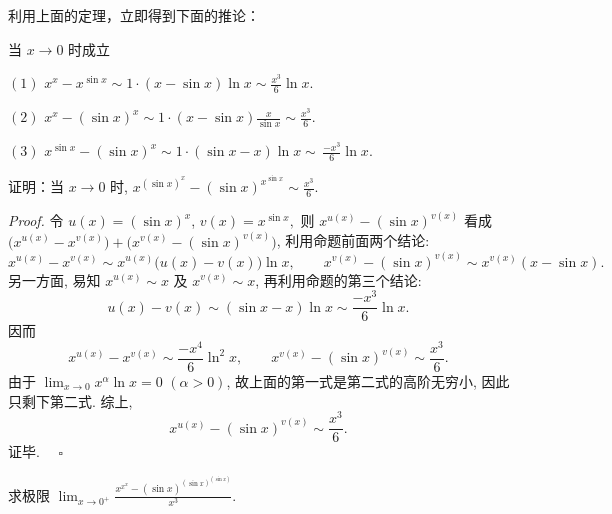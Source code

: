 利用上面的定理，立即得到下面的推论：

\begin{corollary}{}
当 $x\to0$ 时成立

$(1)$ $x^{x}-x^{\sin x}\sim1\cdot(x-\sin x)\ln x\sim\frac{x^{3}}{6}\ln x.$

$(2)$ $x^{x}-(\sin x)^{x}\sim1\cdot(x-\sin x)\frac{x}{\sin x}\sim\frac{x^{3}}{6}.$

$(3)$ $x^{\sin x}-(\sin x)^{x}\sim1\cdot(\sin x-x)\ln x\sim\,\frac{-x^{3}}{6}\ln x.$
\end{corollary}

\vs

\begin{example}{}
证明：当 $x\to0$ 时, $x^{(\sin x)^{x}}-(\sin x)^{x^{\sin x}}\sim\frac{x^{3}}{6}.$ 
\end{example}
\textsl{Proof.} 令 $u(x)=(\sin x)^{x}$, $v(x)=x^{\sin x},$ 则 $x^{u(x)}-(\sin x)^{v(x)}$
看成 $\big(x^{u(x)}-x^{v(x)}\big)+\big(x^{v(x)}-(\sin x)^{v(x)}\big)$,
利用命题前面两个结论: 
\[
x^{u(x)}-x^{v(x)}\sim x^{u(x)}\big(u(x)-v(x)\big)\ln x,\qquad x^{v(x)}-(\sin x)^{v(x)}\sim x^{v(x)}(x-\sin x).~
\]
另一方面, 易知 $x^{u(x)}\sim x$ 及 $x^{v(x)}\sim x$, 再利用命题的第三个结论: 
\[
u(x)-v(x)\sim(\sin x-x)\ln x\sim\frac{-x^{3}}{6}\ln x.~
\]
因而 
\[
x^{u(x)}-x^{v(x)}\sim\frac{-x^{4}}{6}\ln^{2}x,\qquad x^{v(x)}-(\sin x)^{v(x)}\sim\frac{x^{3}}{6}.~
\]
由于 ${\displaystyle \lim_{x\to0}x^{\alpha}\ln x=0}$ $(\alpha>0)$,
故上面的第一式是第二式的高阶无穷小, 因此只剩下第二式. 综上, $$x^{u(x)}-(\sin x)^{v(x)}\sim\frac{x^{3}}{6}.~$$  证毕. $\quad\square$

\begin{exercise}{}
求极限 $\displaystyle\lim_{x\to 0^+}\frac{x^{x^x}-(\sin x)^{(\sin x)^{(\sin x)}}}{x^3}$.
\end{exercise}
